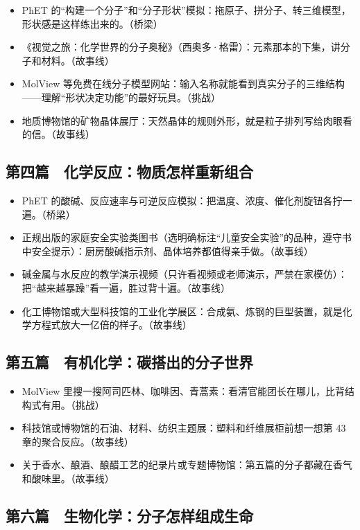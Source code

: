 \begin{itemize}[itemsep=2pt]
\item PhET 的“构建一个分子”和“分子形状”模拟：拖原子、拼分子、转三维模型，形状感是这样练出来的。（桥梁）
\item 《视觉之旅：化学世界的分子奥秘》（西奥多·格雷）：元素那本的下集，讲分子和材料。（故事线）
\item MolView 等免费在线分子模型网站：输入名称就能看到真实分子的三维结构——理解“形状决定功能”的最好玩具。（挑战）
\item 地质博物馆的矿物晶体展厅：天然晶体的规则外形，就是粒子排列写给肉眼看的信。（故事线）
\end{itemize}

\subsection*{第四篇　化学反应：物质怎样重新组合}

\begin{itemize}[itemsep=2pt]
\item PhET 的酸碱、反应速率与可逆反应模拟：把温度、浓度、催化剂旋钮各拧一遍。（桥梁）
\item 正规出版的家庭安全实验类图书（选明确标注“儿童安全实验”的品种，遵守书中安全提示）：厨房酸碱指示剂、晶体培养都值得亲手做。（故事线）
\item 碱金属与水反应的教学演示视频（只许看视频或老师演示，严禁在家模仿）：把“越来越暴躁”看一遍，胜过背十遍。（故事线）
\item 化工博物馆或大型科技馆的工业化学展区：合成氨、炼钢的巨型装置，就是化学方程式放大一亿倍的样子。（故事线）
\end{itemize}

\subsection*{第五篇　有机化学：碳搭出的分子世界}

\begin{itemize}[itemsep=2pt]
\item MolView 里搜一搜阿司匹林、咖啡因、青蒿素：看清官能团长在哪儿，比背结构式有用。（挑战）
\item 科技馆或博物馆的石油、材料、纺织主题展：塑料和纤维展柜前想一想第 43 章的聚合反应。（故事线）
\item 关于香水、酿酒、酿醋工艺的纪录片或专题博物馆：第五篇的分子都藏在香气和酸味里。（故事线）
\end{itemize}

\subsection*{第六篇　生物化学：分子怎样组成生命}

